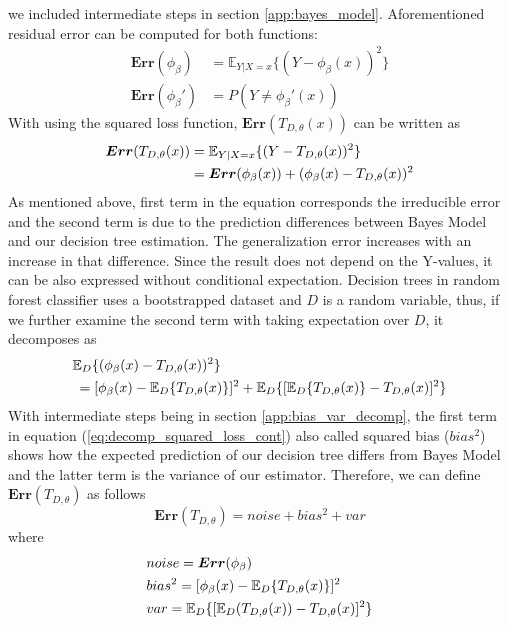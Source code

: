 we included intermediate steps in section \ref{app:bayes_model}. 
Aforementioned residual error can be computed for both functions:
\begin{align}
\boldsymbol{Err}(\phi_{\beta}) & = \mathbb{E}_{Y|X=x}\{(Y-\phi_{\beta}(x))^2 \}\\
\boldsymbol{Err}(\phi_{\beta}') & = P(Y \neq \phi_{\beta}'(x) )
\end{align}
With using the squared loss function, $\boldsymbol{Err}(T_{D,\theta}(x))$ can be written as
\begin{align}\label{eq:decomp_squared_loss}
\boldsymbol{Err}(T_{D, \theta}(x)) & = \mathbb{E}_{Y|X=x}\{(Y-T_{D,\theta}(x))^2\} \notag \\
							   	  & = \boldsymbol{Err}(\phi_{\beta}(x)) + (\phi_{\beta}(x)-T_{D,\theta}(x))^2
\end{align}
As mentioned above, first term in the equation corresponds the 
irreducible error and the second term is due to the prediction differences between Bayes Model and our decision tree estimation. 
The generalization error increases with an increase in that difference. Since the result does not depend on the Y-values, 
it can be also expressed without conditional expectation. Decision trees in random forest classifier uses a bootstrapped dataset 
and $D$ is a random variable, thus, if we further examine the second term with taking expectation over $D$, it decomposes as
\begin{align}\label{eq:decomp_squared_loss_cont}
	& \mathbb{E}_{D}\{(\phi_{\beta}(x) - T_{D,\theta}(x))^2 \} \notag \\
	& \: = [\phi_{\beta}(x) - \mathbb{E}_{D}\{T_{D,\theta}(x)\}]^2 + 
	\mathbb{E}_{D}\{[\mathbb{E}_{D}\{T_{D,\theta}(x)\} - T_{D,\theta}(x)]^2\}
\end{align}
With intermediate steps being in section \ref{app:bias_var_decomp}, 
the first term in equation (\ref{eq:decomp_squared_loss_cont}) also called squared bias ($bias^2$) shows how the expected prediction of our 
decision tree differs from Bayes Model and the latter term is the variance of our estimator. 
Therefore, we can define $\boldsymbol{Err}(T_{D,\theta})$ as follows
\begin{equation}
\boldsymbol{Err}(T_{D,\theta}) = noise + bias^2 + var
\end{equation}
\vspace{-3mm}
\qquad \qquad \qquad \quad where
\vspace{-6.3mm}
\begin{align}
& noise = \boldsymbol{Err}(\phi_{\beta}) \notag \\
& bias^2 = [\phi_{\beta}(x) - \mathbb{E}_{D}\{T_{D,\theta}(x)\}]^2 \notag \\
& var = \mathbb{E}_{D}\{[\mathbb{E}_{D}(T_{D,\theta}(x)) - T_{D,\theta}(x)]^2\} \notag
\end{align}
